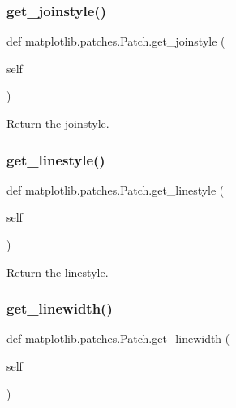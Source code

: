 \subsubsection{\texorpdfstring{get\+\_\+joinstyle()}{get\_joinstyle()}}
{\footnotesize\ttfamily def matplotlib.\+patches.\+Patch.\+get\+\_\+joinstyle (\begin{DoxyParamCaption}\item[{}]{self }\end{DoxyParamCaption})}

\begin{DoxyVerb}Return the joinstyle.\end{DoxyVerb}
 \mbox{\label{classmatplotlib_1_1patches_1_1Patch_aac767d328b1555537c35dcb654f2611a}} 
\subsubsection{\texorpdfstring{get\+\_\+linestyle()}{get\_linestyle()}}
{\footnotesize\ttfamily def matplotlib.\+patches.\+Patch.\+get\+\_\+linestyle (\begin{DoxyParamCaption}\item[{}]{self }\end{DoxyParamCaption})}

\begin{DoxyVerb}Return the linestyle.\end{DoxyVerb}
 \mbox{\label{classmatplotlib_1_1patches_1_1Patch_a5716b76f843492ce79264dd5901c83c0}} 
\subsubsection{\texorpdfstring{get\+\_\+linewidth()}{get\_linewidth()}}
{\footnotesize\ttfamily def matplotlib.\+patches.\+Patch.\+get\+\_\+linewidth (\begin{DoxyParamCaption}\item[{}]{self }\end{DoxyParamCaption})}

